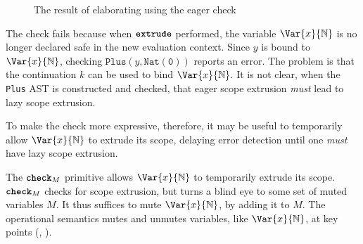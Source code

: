 \begin{figure}[H]
\begin{center}

\end{center}
\caption{The result of elaborating  using the eager check}
\label{fig:core-eager-looks-unsafe}
\end{figure}

The check fails because when $\textbf{\texttt{extrude}}$ performed, the variable $\Var{x}{\mathbb{N}}$ is no longer declared safe in the new evaluation context. Since $y$ is bound to $\Var{x}{\mathbb{N}}$, checking $\texttt{Plus}(y, \texttt{Nat}(\texttt{0}))$ reports an error. The problem is that the continuation $k$ can be used to bind $\Var{x}{\mathbb{N}}$. It is not clear, when the \texttt{Plus} AST is constructed and checked, that eager scope extrusion \textit{must} lead to lazy scope extrusion. 

To make the check more expressive, therefore, it may be useful to temporarily allow $\Var{x}{\mathbb{N}}$ to extrude its scope, delaying error detection until one \textit{must} have lazy scope extrusion. 

The $\textbf{\texttt{check}}_M$ primitive allows $\Var{x}{\mathbb{N}}$ to temporarily extrude its scope. $\textbf{\texttt{check}}_M$ checks for scope extrusion, but turns a blind eye to some set of muted variables $M$. It thus suffices to mute $\Var{x}{\mathbb{N}}$, by adding it to $M$. The \coreLang{} operational semantics mutes and unmutes variables, like $\Var{x}{\mathbb{N}}$, at key points (, ). 

